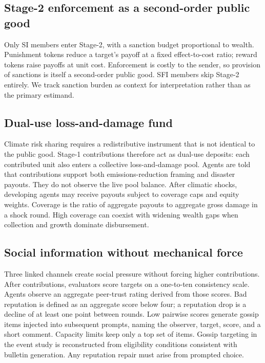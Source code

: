 \subsection{Stage-2 enforcement as a second-order public good}

Only SI members enter Stage-2, with a sanction budget proportional to wealth.
Punishment tokens reduce a target's payoff at a fixed effect-to-cost ratio; reward tokens raise payoffs at unit cost.
Enforcement is costly to the sender, so provision of sanctions is itself a second-order public good.
SFI members skip Stage-2 entirely.
We track sanction burden as context for interpretation rather than as the primary estimand.

\subsection{Dual-use loss-and-damage fund}

Climate risk sharing requires a redistributive instrument that is not identical to the public good.
Stage-1 contributions therefore act as dual-use deposits: each contributed unit also enters a collective loss-and-damage pool.
Agents are told that contributions support both emissions-reduction framing and disaster payouts.
They do not observe the live pool balance.
After climatic shocks, developing agents may receive payouts subject to coverage caps and equity weights.
Coverage is the ratio of aggregate payouts to aggregate gross damage in a shock round.
High coverage can coexist with widening wealth gaps when collection and growth dominate disbursement.

\subsection{Social information without mechanical force}

Three linked channels create social pressure without forcing higher contributions.
After contributions, evaluators score targets on a one-to-ten consistency scale.
Agents observe an aggregate peer-trust rating derived from those scores.
Bad reputation is defined as an aggregate score below four; a reputation drop is a decline of at least one point between rounds.
Low pairwise scores generate gossip items injected into subsequent prompts, naming the observer, target, score, and a short comment.
Capacity limits keep only a top set of items.
Gossip targeting in the event study is reconstructed from eligibility conditions consistent with bulletin generation.
Any reputation repair must arise from prompted choice.

